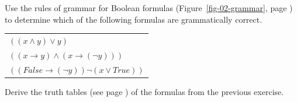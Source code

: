 \begin{ExerciseList}

\Exercise Use the rules of grammar for Boolean formulas (Figure~\ref{fig-02-grammar}, page \pageref{fig-02-grammar})
to determine which of the following formulas are grammatically correct.
\begin{center}
\begin{tabular}{l}
$((x \wedge y) \vee y )$ \\
$((x \rightarrow y) \wedge (x \rightarrow (\neg y)))$ \\
$((False \rightarrow (\neg y)) \neg (x \vee True))$ \\
\end{tabular}
\end{center}


\Exercise Derive the truth tables (see page \pageref{truth-tables}) of the formulas from the previous exercise.


\end{ExerciseList}
